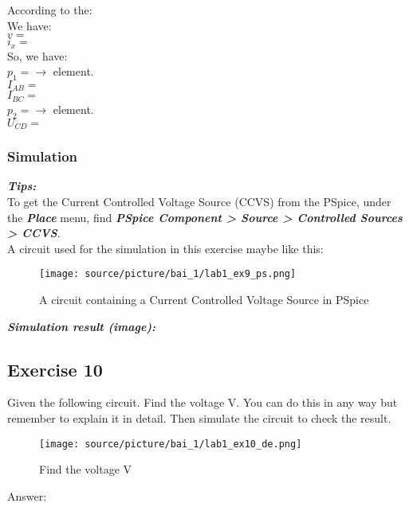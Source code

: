 According to the: \dotfill\bigskip\\
We have:\bigskip\\
$v =$\dotfill\bigskip\\
$i_x =$\dotfill\bigskip\\
So, we have:\bigskip\\
$p_1 =$\dotfill $\longrightarrow$ \dotfill element.\bigskip\\
$I_{AB} =$ \dotfill\bigskip\\
$I_{BC} =$ \dotfill\bigskip\\
$p_2 =$\dotfill $\longrightarrow$ \dotfill element.\bigskip\\
$U_{CD} =$\dotfill\bigskip\\

\subsubsection{Simulation}

\textbf{\textit{Tips:}}\\
To get the Current Controlled Voltage Source (CCVS) from the PSpice, under the \textit{\textbf{Place}} menu, find \textbf{\textit{PSpice Component > Source > Controlled Sources > CCVS}}.\\

A circuit used for the simulation in this exercise maybe like this:
\begin{figure}[H]
    \centering
    \texttt{[image: source/picture/bai\_1/lab1\_ex9\_ps.png]}
    \caption{A circuit containing a Current Controlled Voltage Source in PSpice}
    \label{lab1_ex9_ps}
\end{figure}

\textit{\textbf{Simulation result (image):}}
\newpage

\subsection{Exercise 10}
Given the following circuit. Find the voltage V. You can do this in any way but remember to explain it in detail. Then simulate the circuit to check the result.

\begin{figure}[H]
    \centering
    \texttt{[image: source/picture/bai\_1/lab1\_ex10\_de.png]}
    \caption{Find the voltage V}
    \label{lab1_ex10_de}
\end{figure}

Answer:

